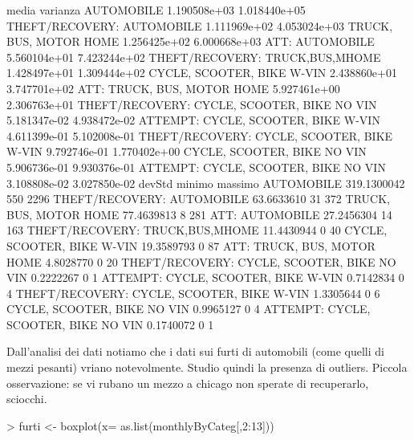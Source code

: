 \documentclass{article}
\begin{document}
\begin{Schunk}
\begin{Soutput}
                                                   media     varianza
AUTOMOBILE                                  1.190508e+03 1.018440e+05
THEFT/RECOVERY: AUTOMOBILE                  1.111969e+02 4.053024e+03
TRUCK, BUS, MOTOR HOME                      1.256425e+02 6.000668e+03
ATT: AUTOMOBILE                             5.560104e+01 7.423244e+02
THEFT/RECOVERY: TRUCK,BUS,MHOME             1.428497e+01 1.309444e+02
CYCLE, SCOOTER, BIKE W-VIN                  2.438860e+01 3.747701e+02
ATT: TRUCK, BUS, MOTOR HOME                 5.927461e+00 2.306763e+01
THEFT/RECOVERY: CYCLE, SCOOTER, BIKE NO VIN 5.181347e-02 4.938472e-02
ATTEMPT: CYCLE, SCOOTER, BIKE W-VIN         4.611399e-01 5.102008e-01
THEFT/RECOVERY: CYCLE, SCOOTER, BIKE W-VIN  9.792746e-01 1.770402e+00
CYCLE, SCOOTER, BIKE NO VIN                 5.906736e-01 9.930376e-01
ATTEMPT: CYCLE, SCOOTER, BIKE NO VIN        3.108808e-02 3.027850e-02
                                                 devStd minimo massimo
AUTOMOBILE                                  319.1300042    550    2296
THEFT/RECOVERY: AUTOMOBILE                   63.6633610     31     372
TRUCK, BUS, MOTOR HOME                       77.4639813      8     281
ATT: AUTOMOBILE                              27.2456304     14     163
THEFT/RECOVERY: TRUCK,BUS,MHOME              11.4430944      0      40
CYCLE, SCOOTER, BIKE W-VIN                   19.3589793      0      87
ATT: TRUCK, BUS, MOTOR HOME                   4.8028770      0      20
THEFT/RECOVERY: CYCLE, SCOOTER, BIKE NO VIN   0.2222267      0       1
ATTEMPT: CYCLE, SCOOTER, BIKE W-VIN           0.7142834      0       4
THEFT/RECOVERY: CYCLE, SCOOTER, BIKE W-VIN    1.3305644      0       6
CYCLE, SCOOTER, BIKE NO VIN                   0.9965127      0       4
ATTEMPT: CYCLE, SCOOTER, BIKE NO VIN          0.1740072      0       1
\end{Soutput}
\end{Schunk}
Dall'analisi dei dati notiamo che i dati sui furti di automobili (come quelli di mezzi pesanti) vriano notevolmente. Studio quindi la presenza di outliers.
Piccola osservazione: se vi rubano un mezzo a chicago non sperate di recuperarlo, sciocchi.
\begin{Schunk}
\begin{Sinput}
> furti <- boxplot(x= as.list(monthlyByCateg[,2:13]))
\end{Sinput}
\end{Schunk}
\end{document}
